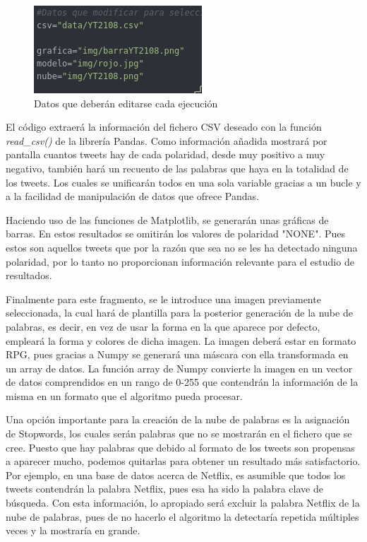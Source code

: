 \begin{figure}[H]
	\centering
	\includegraphics[scale=.5]{imagenes/datosWords.png}
	\caption{Datos que deberán editarse cada ejecución}
	\label{fig:datos-words}
\end{figure}

El código extraerá la información del fichero CSV deseado con la función \textit{read\_csv()} de la librería Pandas. Como información añadida mostrará por pantalla cuantos tweets hay de cada polaridad, desde muy positivo a muy negativo, también hará un recuento de las palabras que haya en la totalidad de los tweets. Los cuales se unificarán todos en una sola variable gracias a un bucle y a la facilidad de manipulación de datos que ofrece Pandas.

Haciendo uso de las funciones de Matplotlib\cite{Hunter:2007}, se generarán unas gráficas de barras. En estos resultados se omitirán los valores de polaridad "NONE". Pues estos son aquellos tweets que por la razón que sea no se les ha detectado ninguna polaridad, por lo tanto no proporcionan información relevante para el estudio de resultados. 
 
 Finalmente para este fragmento, se le introduce una imagen previamente seleccionada, la cual hará de plantilla para la posterior generación de la nube de palabras, es decir, en vez de usar la forma en la que aparece por defecto, empleará la forma y colores de dicha imagen. La imagen deberá estar en formato RPG, pues gracias a Numpy\cite{Numpy} se generará una máscara con ella transformada en un array de datos. La función array de Numpy convierte la imagen en un vector de datos comprendidos en un rango de 0-255 que contendrán la información de la misma en un formato que el algoritmo pueda procesar.




Una opción importante para la creación de la nube de palabras es la asignación de Stopwords, los cuales serán palabras que no se mostrarán en el fichero que se cree. Puesto que hay palabras que debido al formato de los tweets son propensas a aparecer mucho, podemos quitarlas para obtener un resultado más satisfactorio. Por ejemplo, en una base de datos acerca de Netflix, es asumible que todos los tweets contendrán la palabra Netflix, pues esa ha sido la palabra clave de búsqueda. Con esta información, lo apropiado será excluir la palabra Netflix de la nube de palabras, pues de no hacerlo el algoritmo la detectaría repetida múltiples veces y la mostraría en grande. 

